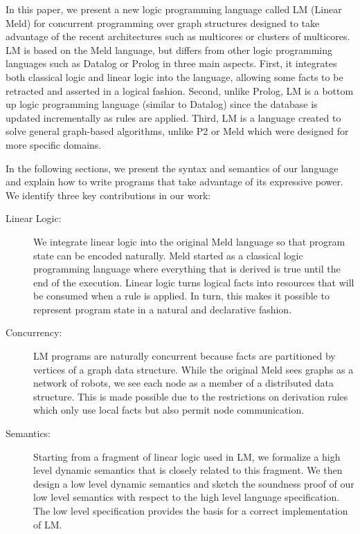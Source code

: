 In this paper, we present a new logic programming language called LM (Linear Meld) for concurrent programming over graph structures designed to take advantage
of the recent architectures such as multicores or clusters of multicores. LM is based on the Meld language, but differs from other logic programming languages
such as Datalog or Prolog in three main aspects. First, it integrates both classical
logic and linear logic into the language, allowing some facts to be retracted and asserted in a logical fashion. Second, unlike
Prolog, LM is a bottom up logic programming language (similar to Datalog) since the database is updated incrementally as rules are
applied. Third, LM is a language created to solve general graph-based algorithms, unlike P2 or Meld which were designed for more specific domains.

In the following sections, we present the syntax and semantics of our language and explain how to write programs that take advantage of its expressive power. We identify three key contributions in our work:

\begin{description}
   \item[Linear Logic:] We integrate linear logic into the original Meld language so that program state can be encoded naturally.
   Meld started as a classical logic programming language where everything that is derived is true until the end
   of the execution. Linear logic turns logical facts into resources that will be consumed when a rule is applied. In turn, this makes it possible to represent program state in a natural and declarative fashion.
   \item[Concurrency:] LM programs are naturally concurrent because facts are partitioned by vertices of a graph data structure. While the original Meld sees graphs as a network of robots, we see each node as a member of a distributed data structure. This is made possible due to the
   restrictions on derivation rules which only use local facts but also permit node communication.
   \item[Semantics:] Starting from a fragment of linear logic used in LM, we formalize a high level dynamic semantics that is closely related to this fragment.
   We then design a low level dynamic semantics and sketch the soundness proof of our low level
   semantics with respect to the high level language specification. The low level specification
   provides the basis for a correct implementation of LM.
\end{description}

